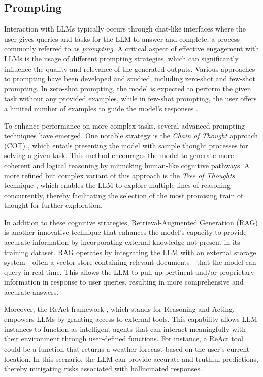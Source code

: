 \documentclass[
  a4paper,
]{scrreprt}
\theoremstyle{definition}
\theoremstyle{remark}
\begin{document}
\subsection{Prompting}\label{sec-prompting}

Interaction with LLMs typically occurs through chat-like interfaces
where the user gives queries and tasks for the LLM to answer and
complete, a process commonly referred to as \emph{prompting}. A critical
aspect of effective engagement with LLMs is the usage of different
prompting strategies, which can significantly influence the quality and
relevance of the generated outputs. Various approaches to prompting have
been developed and studied, including zero-shot and few-shot prompting.
In zero-shot prompting, the model is expected to perform the given task
without any provided examples, while in few-shot prompting, the user
offers a limited number of examples to guide the model's responses
\autocite{brown2020}.

To enhance performance on more complex tasks, several advanced prompting
techniques have emerged. One notable strategy is the \emph{Chain of
Thought} approach (COT) \autocite{chainofthought}, which entails
presenting the model with sample thought processes for solving a given
task. This method encourages the model to generate more coherent and
logical reasoning by mimicking human-like cognitive pathways. A more
refined but complex variant of this approach is the \emph{Tree of
Thoughts} technique \autocite{yao2023}, which enables the LLM to explore
multiple lines of reasoning concurrently, thereby facilitating the
selection of the most promising train of thought for further
exploration.

In addition to these cognitive strategies, Retrieval-Augmented
Generation (RAG) \autocite{lewis2021} is another innovative technique
that enhances the model's capacity to provide accurate information by
incorporating external knowledge not present in its training dataset.
RAG operates by integrating the LLM with an external storage
system---often a vector store containing relevant documents---that the
model can query in real-time. This allows the LLM to pull up pertinent
and/or proprietary information in response to user queries, resulting in
more comprehensive and accurate answers.

Moreover, the ReAct framework \autocite{reAct}, which stands for
Reasoning and Acting, empowers LLMs by granting access to external
tools. This capability allows LLM instances to function as intelligent
agents that can interact meaningfully with their environment through
user-defined functions. For instance, a ReAct tool could be a function
that returns a weather forecast based on the user's current location. In
this scenario, the LLM can provide accurate and truthful predictions,
thereby mitigating risks associated with hallucinated responses.
\end{document}
